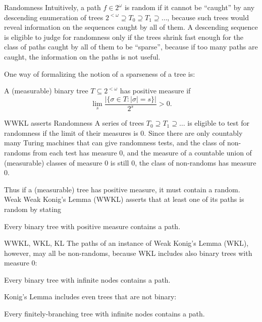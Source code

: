 \begin{frame}{Randomness}
  Intuitively, a path $f\in2^\omega$ is random if it cannot be ``caught''
  by any descending enumeration of trees $2^{<\omega}\supseteq T_0\supseteq
  T_1\supseteq \ldots$, because such trees would reveal information on the
  sequences caught by all of them. A descending sequence is eligible to judge
  for randomness only if the trees shrink fast enough for the class of paths
  caught by all of them to be ``sparse'', because if too many paths are
  caught, the information on the paths is not useful.

  \vspace{1em}
  One way of formalizing the notion of a sparseness of a tree is:
  \begin{define*}
    A (measurable) binary tree $T\subseteq2^{<\omega}$ has positive measure
    if
    \[\lim_s \frac{|\{\sigma\in T: |\sigma|=s\}|}{2^s} >0.\]
  \end{define*}
\end{frame}

\begin{frame}{WWKL asserts Randomness}
  A series of trees $T_0\supseteq T_1\supseteq\ldots$ is eligible to
  test for randomness if the limit of their measures is 0. Since there are
  only countably many Turing machines that can give randomness tests,
  and the class of non-randoms from each test has measure 0, and the
  measure of a countable union of (measurable) classes of measure 0 is
  still 0, the class of non-randoms has measure 0.

  \vspace{2em}
  Thus if a (measurable) tree has positive measure, it must contain a
  random. Weak Weak Konig's Lemma (WWKL) asserts that at least one of its
  paths is random by stating
  \begin{thm*}
    Every binary tree with positive measure contains a path.
  \end{thm*}
\end{frame}

\begin{frame}{WWKL, WKL, KL}
  The paths of an instance of Weak Konig's Lemma (WKL), however, may
  all be non-randoms, because WKL includes also binary trees with measure
  0:
  \begin{thm*}
    Every binary tree with infinite nodes contains a path.
  \end{thm*}

  \vspace{2em}
  Konig's Lemma includes even trees that are not binary:
  \begin{thm*}
    Every finitely-branching tree with infinite nodes contains a path.
  \end{thm*}
\end{frame}


